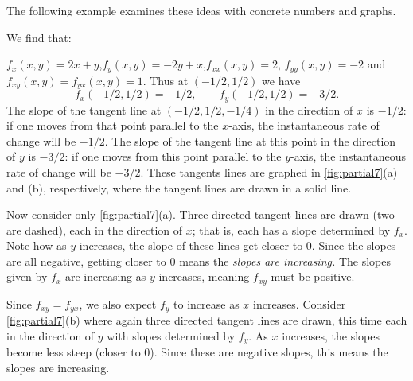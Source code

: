 The following example examines these ideas with concrete numbers and graphs.

{We find that:

$f_x(x,y) = 2x+y$,\quad  $f_y(x,y) = -2y+x$,\quad $f_{xx}(x,y) = 2$, \quad $f_{yy}(x,y) = -2$ and $f_{xy}(x,y) = f_{yx}(x,y) = 1$. Thus at $(-1/2,1/2)$ we have 
\[f_x(-1/2,1/2) = -1/2,\qquad f_y(-1/2,1/2) = -3/2.\]
The slope of the tangent line at $(-1/2, 1/2, -1/4)$ in the direction of $x$ is $-1/2$: if one moves from that point parallel to the $x$-axis, the instantaneous rate of change will be $-1/2$. The slope of the tangent line at this point in the direction of $y$ is $-3/2$: if one moves from this point parallel to the $y$-axis, the instantaneous rate of change will be $-3/2$. These tangents lines are graphed in \autoref{fig:partial7}(a) and (b), respectively, where the tangent lines are drawn in a solid line. 


Now consider only \autoref{fig:partial7}(a). Three directed tangent lines are drawn (two are dashed), each in the direction of $x$; that is, each has a slope determined by $f_x$. Note how as $y$ increases, the slope of these lines get closer to $0$. Since the slopes are all negative, getting closer to 0 means the \textit{slopes are increasing.} The slopes given by $f_x$ are increasing as $y$ increases, meaning $f_{xy}$ must be positive. 

Since $f_{xy}=f_{yx}$, we also expect $f_y$ to increase as $x$ increases. Consider \autoref{fig:partial7}(b) where again three directed tangent lines are drawn, this time each in the direction of $y$ with slopes determined by $f_y$. As $x$ increases, the slopes become less steep (closer to 0). Since these are negative slopes, this means the slopes are increasing.

}
